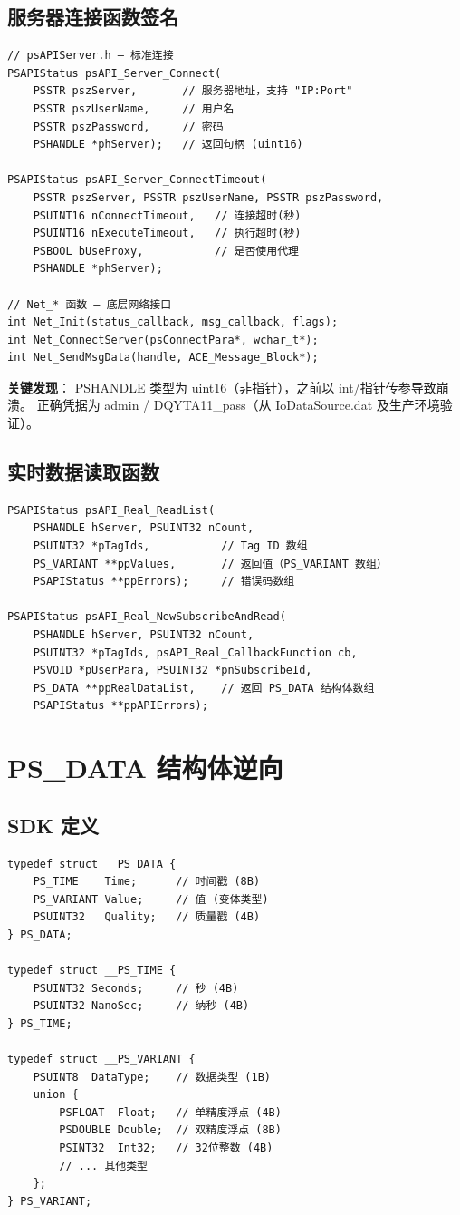 \documentclass[12pt,a4paper]{ctexart}
\begin{document}
\subsection{服务器连接函数签名}
\begin{verbatim}
// psAPIServer.h — 标准连接
PSAPIStatus psAPI_Server_Connect(
    PSSTR pszServer,       // 服务器地址，支持 "IP:Port"
    PSSTR pszUserName,     // 用户名
    PSSTR pszPassword,     // 密码
    PSHANDLE *phServer);   // 返回句柄 (uint16)

PSAPIStatus psAPI_Server_ConnectTimeout(
    PSSTR pszServer, PSSTR pszUserName, PSSTR pszPassword,
    PSUINT16 nConnectTimeout,   // 连接超时(秒)
    PSUINT16 nExecuteTimeout,   // 执行超时(秒)
    PSBOOL bUseProxy,           // 是否使用代理
    PSHANDLE *phServer);

// Net_* 函数 — 底层网络接口
int Net_Init(status_callback, msg_callback, flags);
int Net_ConnectServer(psConnectPara*, wchar_t*);
int Net_SendMsgData(handle, ACE_Message_Block*);
\end{verbatim}

\textbf{关键发现}：
PSHANDLE 类型为 uint16（非指针），之前以 int/指针传参导致崩溃。
正确凭据为 admin / DQYTA11\_pass（从 IoDataSource.dat 及生产环境验证）。

\subsection{实时数据读取函数}
\begin{verbatim}
PSAPIStatus psAPI_Real_ReadList(
    PSHANDLE hServer, PSUINT32 nCount,
    PSUINT32 *pTagIds,           // Tag ID 数组
    PS_VARIANT **ppValues,       // 返回值（PS_VARIANT 数组）
    PSAPIStatus **ppErrors);     // 错误码数组

PSAPIStatus psAPI_Real_NewSubscribeAndRead(
    PSHANDLE hServer, PSUINT32 nCount,
    PSUINT32 *pTagIds, psAPI_Real_CallbackFunction cb,
    PSVOID *pUserPara, PSUINT32 *pnSubscribeId,
    PS_DATA **ppRealDataList,    // 返回 PS_DATA 结构体数组
    PSAPIStatus **ppAPIErrors);
\end{verbatim}

\section{PS\_DATA 结构体逆向}

\subsection{SDK 定义}
\begin{verbatim}
typedef struct __PS_DATA {
    PS_TIME    Time;      // 时间戳 (8B)
    PS_VARIANT Value;     // 值 (变体类型)
    PSUINT32   Quality;   // 质量戳 (4B)
} PS_DATA;

typedef struct __PS_TIME {
    PSUINT32 Seconds;     // 秒 (4B)
    PSUINT32 NanoSec;     // 纳秒 (4B)
} PS_TIME;

typedef struct __PS_VARIANT {
    PSUINT8  DataType;    // 数据类型 (1B)
    union {
        PSFLOAT  Float;   // 单精度浮点 (4B)
        PSDOUBLE Double;  // 双精度浮点 (8B)
        PSINT32  Int32;   // 32位整数 (4B)
        // ... 其他类型
    };
} PS_VARIANT;
\end{verbatim}
\end{document}
